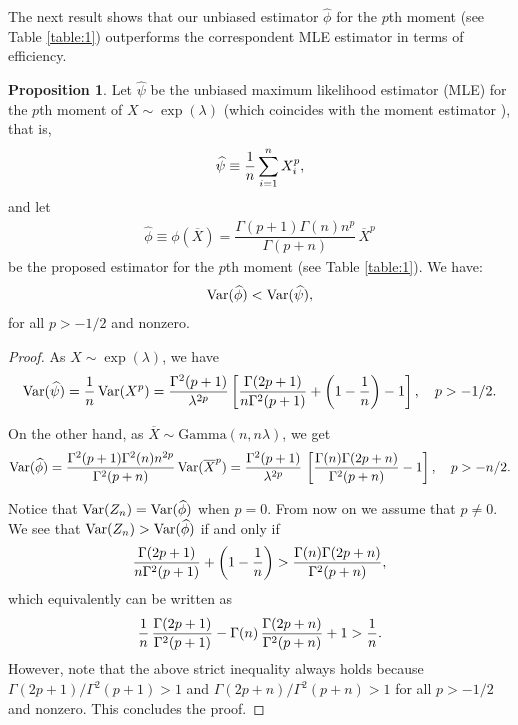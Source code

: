 \documentclass[12pt]{article}
\theoremstyle{definition}
\newtheorem{proposition}[theorem]{Proposition}
\begin{document}
The next result shows that our unbiased estimator $\widehat{\phi}$ for the $p$th moment (see Table \ref{table:1}) outperforms the correspondent MLE estimator in terms of efficiency.
%
\begin{proposition}\label{prop-compare-var}
	Let $\widehat{\psi}$ be the unbiased maximum likelihood estimator (MLE) for the $p$th moment of $X\sim\exp(\lambda)$ (which coincides with the moment estimator \citep{Davidson1974}), 
	that is,
	\begin{align*}
		\widehat{\psi}\equiv{1\over n}\sum_{i=1}^n X_i^p,
	\end{align*} 
	and let
	\begin{align*}
		\widehat{\phi}
		\equiv 
		\phi(\overline{X})
		=
		\dfrac{\Gamma(p+1)\Gamma(n) n^p}{\Gamma(p+n)} \, \overline{X}^{p}
	\end{align*}
	be the proposed estimator for  the $p$th moment (see Table \ref{table:1}).
	We have:
	\begin{align*}
		{\rm Var}(\widehat{\phi})<{\rm Var}(\widehat{\psi}),
	\end{align*}
	for all $p>-1/2$ and nonzero.
\end{proposition}
\begin{proof} 
	As $X\sim \exp(\lambda)$, we have
	\begin{align*}
		{\rm Var}(\widehat{\psi})
		=
		{1\over n}\, {\rm Var}(X^p)
		=
		{\Gamma^2(p+1)\over\lambda^{2p}}
		\left[
		{\Gamma(2p+1)\over n\Gamma^2(p+1) }
		+
		\left(1-{1\over n}\right)
		-
		1
		\right],
		\quad p>-1/2.
	\end{align*}
	
	On the other hand, as $\overline{X}\sim\text{Gamma}(n,n\lambda)$, we get
	\begin{align*}
		{\rm Var}(\widehat{\phi})
		=
		\dfrac{\Gamma^2(p+1)\Gamma^2(n) n^{2p}}{\Gamma^2(p+n)} \,
		{\rm Var}(\overline{X}^{p})
		=
		\dfrac{\Gamma^2(p+1) }{\lambda^{2p}} \,
		\left[
		{\Gamma(n) \Gamma(2p+n)\over \Gamma^2(p+n) }
		-
		1
		\right],
		\quad p>-n/2.
	\end{align*}
	
	Notice that ${\rm Var}(Z_n)= {\rm Var}(\widehat{\phi})$ when $p=0$.  From now on we assume that $p\neq 0$.  We see that
	${\rm Var}(Z_n)> {\rm Var}(\widehat{\phi})$ if and only if
	\begin{align*}
		{\Gamma(2p+1)\over n\Gamma^2(p+1) }
		+
		\left(1-{1\over n}\right)
		>
		{\Gamma(n) \Gamma(2p+n)\over \Gamma^2(p+n) },
	\end{align*}
	which equivalently can be written as
	\begin{align*}
		{1\over n} \,
		{\Gamma(2p+1)\over \Gamma^2(p+1) }
		-
		\Gamma(n) \,
		{\Gamma(2p+n)\over \Gamma^2(p+n) }
		+
		1
		>
		{1\over n}.
	\end{align*}
	However, note that the above strict inequality always holds because ${\Gamma(2p+1)/\Gamma^2(p+1) }> 1$ and $ {\Gamma(2p+n)/\Gamma^2(p+n) }> 1$ for all $p>-1/2$ and nonzero.
	This concludes the proof.
\end{proof}
\end{document}
